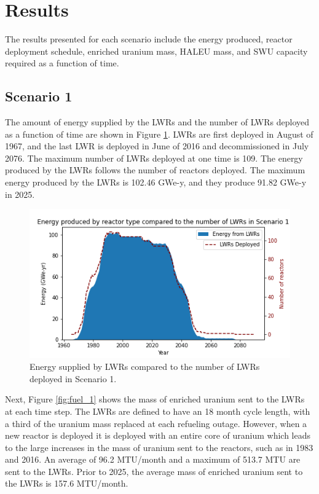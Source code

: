 \section{Results}
The results presented for each scenario include the energy produced, reactor 
deployment schedule, enriched
uranium mass, \gls{HALEU} mass, and \gls{SWU} capacity required as a function of time. 

\subsection{Scenario 1}
The amount of energy supplied by the \glspl{LWR} and the number of \glspl{LWR}
deployed as a function of time are shown in Figure \ref{fig:energy_rx_1}. 
\glspl{LWR} are first deployed in August of 1967, and the last 
\gls{LWR} is deployed in June of 2016 and decommissioned in July 2076. The 
maximum number of 
\glspl{LWR} deployed at one time is 109. The energy produced by the 
\glspl{LWR} follows the number of reactors deployed. The maximum energy 
produced by the \glspl{LWR} is 102.46 GWe-y, and they produce 91.82 GWe-y 
in 2025.

\begin{figure}
    \centering 
    \includegraphics[width=\textwidth]{../figures/energy_scenario1.png}
    \caption{Energy supplied by \glspl{LWR} compared to the number of 
    \glspl{LWR} deployed in Scenario 1.}
    \label{fig:energy_rx_1}
\end{figure}

Next, Figure \ref{fig:fuel_1} shows the mass of enriched uranium sent to 
the \glspl{LWR} at each time step. The \glspl{LWR} are 
defined to have an 18 month cycle length, with a third of the uranium 
mass replaced at each refueling outage. However, when a new reactor 
is deployed it is deployed with an entire core of uranium which leads 
to the large increases in the mass of uranium sent to the reactors, such 
as in 1983 and 2016. An average of 96.2 MTU/month and a maximum of 513.7 MTU 
are sent to the \glspl{LWR}. Prior to 2025, the average mass
of enriched uranium sent to the \glspl{LWR} is 157.6 MTU/month. 

